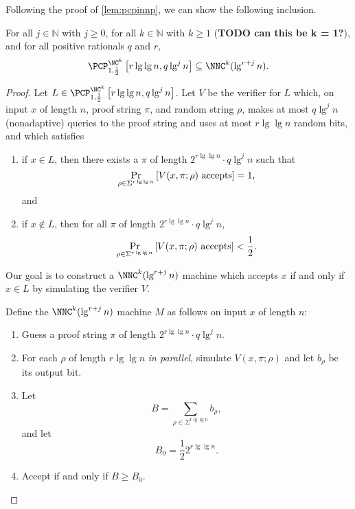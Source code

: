 \documentclass[]{article}
\newcommand{\PCPcs}[5]{\PCP^{#1}_{#2, #3}\left[#4, #5\right]}
\begin{document}
Following the proof of \autoref{lem:pcpinnp}, we can show the following inclusion.
\begin{proposition}\label{prop:pcpinnnc}
  For all $j \in \mathbb{N}$ with $j \geq 0$, for all $k \in \mathbb{N}$ with $k \geq 1$ (\textbf{TODO can this be k = 1?}), and for all positive rationals $q$ and $r$,
  \begin{equation*}
    \PCPcs{\NC^k}{1}{\frac{1}{2}}{r \lg \lg n}{q \lg^j n} \subseteq \NNC^k(\lg^{r + j} n).
  \end{equation*}
\end{proposition}
\begin{proof}
  Let $L \in \PCPcs{\NC^k}{1}{\frac{1}{2}}{r \lg \lg n}{q \lg^j n}$.
  Let $V$ be the \PCP{} verifier for $L$ which, on input $x$ of length $n$, proof string $\pi$, and random string $\rho$, makes at most $q \lg^j n$ (nonadaptive) queries to the proof string and uses at most $r \lg \lg n$ random bits, and which satisfies
  \begin{enumerate}
  \item if $x \in L$, then there exists a $\pi$ of length $2^{r \lg \lg n} \cdot q \lg^j n$ such that
    \begin{equation*}
      \Pr_{\rho \in \Sigma^{r \lg \lg n}}{\left[V(x, \pi; \rho) \textnormal{ accepts}\right]} = 1,
    \end{equation*}
    and
  \item if $x \notin L$, then for all $\pi$ of length $2^{r \lg \lg n} \cdot q \lg^j n$,
    \begin{equation*}
      \Pr_{\rho \in \Sigma^{r \lg \lg n}}{\left[V(x, \pi; \rho) \textnormal{ accepts}\right]} < \frac{1}{2}.
    \end{equation*}
  \end{enumerate}
  Our goal is to construct a $\NNC^k(\lg^{r + j} n)$ machine which accepts $x$ if and only if $x \in L$ by simulating the \PCP{} verifier $V$.

  Define the $\NNC^k(\lg^{r + j} n)$ machine $M$ as follows on input $x$ of length $n$:
  \begin{enumerate}
  \item Guess a proof string $\pi$ of length $2^{r \lg \lg n} \cdot q \lg^j n$.
  \item For each $\rho$ of length $r \lg \lg n$ \emph{in parallel}, simulate $V(x, \pi; \rho)$ and let $b_\rho$ be its output bit.
  \item Let
    \begin{equation*}
      B = \sum_{\rho \in \Sigma^{r \lg \lg n}}{b_\rho},
    \end{equation*}
    and let
    \begin{equation*}
      B_0 = \frac{1}{2} 2^{r \lg \lg n}.
    \end{equation*}
  \item Accept if and only if $B \geq B_0$.
  \end{enumerate}


\end{proof}
\end{document}
